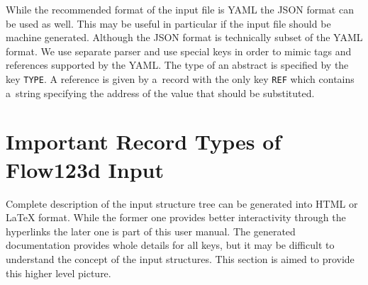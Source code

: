 While the recommended format of the input file is YAML the JSON format can be used as well. This may be useful in particular if the input file
should be machine generated. Although the JSON format is technically subset of the YAML format. We use separate parser and use special keys in order to
mimic tags and references supported by the YAML. The type of an abstract is specified by the key \verb'TYPE'. A reference is given by a~record with the only key 
\verb'REF' which contains a~string specifying the address of the value that should be substituted.



\section{Important Record Types of Flow123d Input}
Complete description of the input structure tree can be generated into HTML or LaTeX format. While the former one provides better interactivity 
through the hyperlinks the later one is part of this user manual. The generated documentation provides whole details for all keys, but 
it may be difficult to understand the concept of the input structures. This section is aimed to provide this higher level picture.

